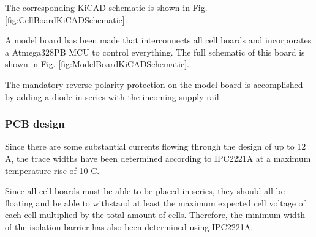 The corresponding KiCAD schematic is shown in Fig. \ref{fig:CellBoardKiCADSchematic}.

A model board has been made that interconnects all cell boards and incorporates a Atmega328PB MCU to control everything. The full schematic of this board is shown in Fig. \ref{fig:ModelBoardKiCADSchematic}. 

The mandatory reverse polarity protection on the model board is accomplished by adding a diode in series with the incoming supply rail.

\subsubsection{PCB design}
Since there are some substantial currents flowing through the design of up to 12 A, the trace widths have been determined according to IPC2221A at a maximum temperature rise of 10 \textdegree C.

Since all cell boards must be able to be placed in series, they should all be floating and be able to withstand at least the maximum expected cell voltage of each cell multiplied by the total amount of cells. Therefore, the minimum width of the isolation barrier has also been determined using IPC2221A.

